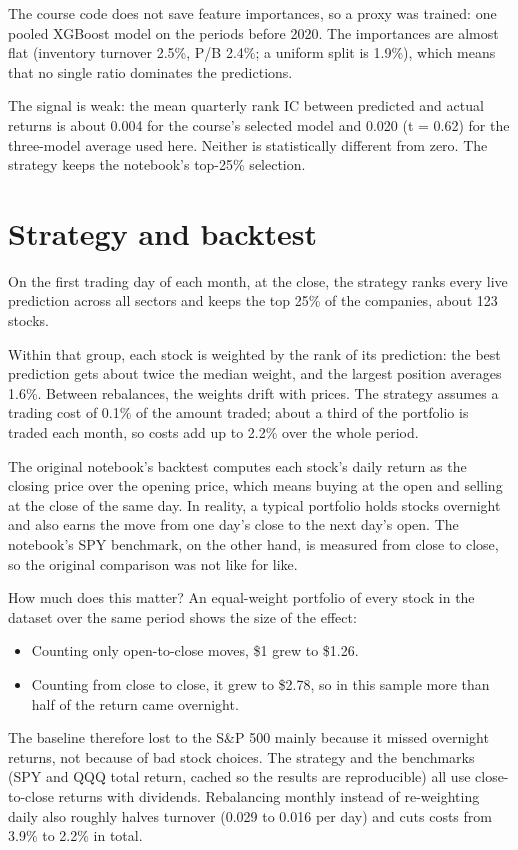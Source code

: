 \documentclass[10pt]{article}
\begin{document}
The course code does not save feature importances, so a proxy was trained: one pooled XGBoost model on
the periods before 2020. The importances are almost flat (inventory turnover 2.5\%, P/B 2.4\%; a
uniform split is 1.9\%), which means that no single ratio dominates the predictions.

The signal is weak: the mean quarterly rank IC between predicted and actual returns is about 0.004 for
the course's selected model and 0.020 (t = 0.62) for the three-model average used here. Neither is
statistically different from zero. The strategy keeps the notebook's top-25\% selection.

\section{Strategy and backtest}
On the first trading day of each month, at the close, the strategy ranks every live prediction across
all sectors and keeps the top 25\% of the companies, about 123 stocks.

Within that group, each stock is weighted by the rank of its prediction: the best prediction gets
about twice the median weight, and the largest position averages 1.6\%. Between rebalances, the
weights drift with prices. The strategy assumes a trading cost of 0.1\% of the amount traded; about a
third of the portfolio is traded each month, so costs add up to 2.2\% over the whole period.

The original notebook's backtest computes each stock's daily return as the closing price over the
opening price, which means buying at the open and selling at the close of the same day. In reality, a
typical portfolio holds stocks overnight and also earns the move from one day's close to the next
day's open. The notebook's SPY benchmark, on the other hand, is measured from close to close, so the
original comparison was not like for like.

How much does this matter? An equal-weight portfolio of every stock in the dataset over the same period
shows the size of the effect:
\begin{itemize}\setlength{\itemsep}{1pt}
\item Counting only open-to-close moves, \$1 grew to \$1.26.
\item Counting from close to close, it grew to \$2.78, so in this sample more than half of the return
came overnight.
\end{itemize}
The baseline therefore lost to the S\&P 500 mainly because it missed overnight returns, not because of
bad stock choices. The strategy and the benchmarks (SPY and QQQ total return, cached so the results are
reproducible) all use close-to-close returns with dividends. Rebalancing monthly instead of
re-weighting daily also roughly halves turnover (0.029 to 0.016 per day) and cuts costs from 3.9\% to
2.2\% in total.
\end{document}
